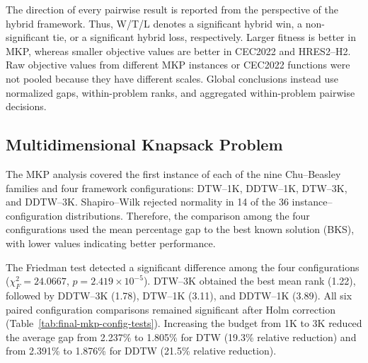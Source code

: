 The direction of every pairwise result is reported from the perspective of
the hybrid framework. Thus, W/T/L denotes a significant hybrid win, a
non-significant tie, or a significant hybrid loss, respectively. Larger
fitness is better in MKP, whereas smaller objective values are better in
CEC2022 and HRES2--H2. Raw objective values from different MKP instances or
CEC2022 functions were not pooled because they have different scales. Global
conclusions instead use normalized gaps, within-problem ranks, and aggregated
within-problem pairwise decisions.

\begin{table}[htbp]
\centering
\caption{Statistical design and principal comparison against standalone
metaheuristics in each domain.}
\label{tab:final-stat-protocol}
\small
{}
\end{table}

\subsection{Multidimensional Knapsack Problem}
\label{sec:final-stat-mkp}

The MKP analysis covered the first instance of each of the nine Chu--Beasley
families and four framework configurations: DTW--1K, DDTW--1K, DTW--3K, and
DDTW--3K. Shapiro--Wilk rejected normality in 14 of the 36
instance--configuration distributions. Therefore, the comparison among the
four configurations used the mean percentage gap to the best known solution
(BKS), with lower values indicating better performance.

The Friedman test detected a significant difference among the four
configurations ($\chi_F^2=24.0667$, $p=2.419\times10^{-5}$). DTW--3K obtained
the best mean rank (1.22), followed by DDTW--3K (1.78), DTW--1K (3.11), and
DDTW--1K (3.89). All six paired configuration comparisons remained
significant after Holm correction (Table~\ref{tab:final-mkp-config-tests}).
Increasing the budget from 1K to 3K reduced the average gap from 2.237\% to
1.805\% for DTW (19.3\% relative reduction) and from 2.391\% to 1.876\% for
DDTW (21.5\% relative reduction).

